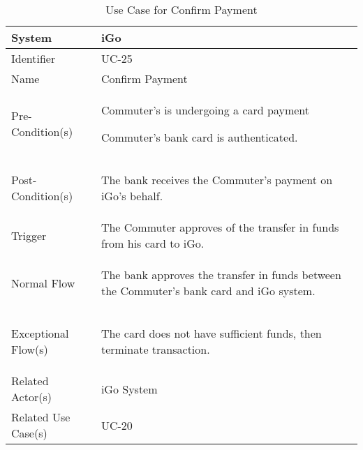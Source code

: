 \begin{table}[ht]
    \centering
    \begin{tabular}{|l|p{11cm}|}
        \hline
        System             & iGo\\
        \hline
        Identifier         & UC-25 \\
        \hline
        Name               & Confirm Payment\\
        \hline
        Pre-Condition(s)   & 
        \begin{enumerate*}[itemjoin=\newline]
            \item Commuter's is undergoing a card payment
            \item Commuter's bank card is authenticated.
        \end{enumerate*} \\
        \hline
        Post-Condition(s)  & 
        \begin{enumerate*}[itemjoin=\newline]
            \item The bank receives the Commuter's payment on iGo's behalf.
        \end{enumerate*} \\
        \hline
        Trigger            & The Commuter approves of the transfer in funds from his card to iGo. \\
        \hline
        Normal Flow        & 
        \begin{enumerate*}[itemjoin=\newline]
            \item The bank approves the transfer in funds between the Commuter's bank card and iGo system.
        \end{enumerate*} \\
        \hline
        Exceptional Flow(s)& 
        \begin{enumerate*}[itemjoin=\newline]
            \item The card does not have sufficient funds, then terminate transaction.
        \end{enumerate*} \\
        \hline
        Related Actor(s)   & iGo System \\
        \hline
        Related Use Case(s)& UC-20\\
        \hline
    \end{tabular}
    \caption{Use Case for Confirm Payment}
    \label{tab:UC_ConfirmPayment}
\end{table}


